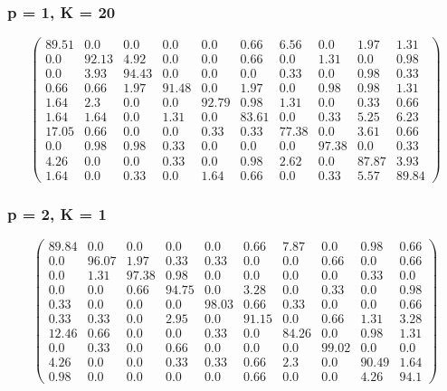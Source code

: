 \begin{appendices}
\subsubsection*{p = 1, K = 20}
$$\begin{pmatrix}
89.51&0.0&0.0&0.0&0.0&0.66&6.56&0.0&1.97&1.31\\
0.0&92.13&4.92&0.0&0.0&0.66&0.0&1.31&0.0&0.98\\
0.0&3.93&94.43&0.0&0.0&0.0&0.33&0.0&0.98&0.33\\
0.66&0.66&1.97&91.48&0.0&1.97&0.0&0.98&0.98&1.31\\
1.64&2.3&0.0&0.0&92.79&0.98&1.31&0.0&0.33&0.66\\
1.64&1.64&0.0&1.31&0.0&83.61&0.0&0.33&5.25&6.23\\
17.05&0.66&0.0&0.0&0.33&0.33&77.38&0.0&3.61&0.66\\
0.0&0.98&0.98&0.33&0.0&0.0&0.0&97.38&0.0&0.33\\
4.26&0.0&0.0&0.33&0.0&0.98&2.62&0.0&87.87&3.93\\
1.64&0.0&0.33&0.0&1.64&0.66&0.0&0.33&5.57&89.84
\end{pmatrix}$$

\subsubsection*{p = 2, K = 1}
$$\begin{pmatrix}
89.84&0.0&0.0&0.0&0.0&0.66&7.87&0.0&0.98&0.66\\
0.0&96.07&1.97&0.33&0.33&0.0&0.0&0.66&0.0&0.66\\
0.0&1.31&97.38&0.98&0.0&0.0&0.0&0.0&0.33&0.0\\
0.0&0.0&0.66&94.75&0.0&3.28&0.0&0.33&0.0&0.98\\
0.33&0.0&0.0&0.0&98.03&0.66&0.33&0.0&0.0&0.66\\
0.33&0.33&0.0&2.95&0.0&91.15&0.0&0.66&1.31&3.28\\
12.46&0.66&0.0&0.0&0.33&0.0&84.26&0.0&0.98&1.31\\
0.0&0.33&0.0&0.66&0.0&0.0&0.0&99.02&0.0&0.0\\
4.26&0.0&0.0&0.33&0.33&0.66&2.3&0.0&90.49&1.64\\
0.98&0.0&0.0&0.0&0.0&0.66&0.0&0.0&4.26&94.1
\end{pmatrix}$$


\end{appendices}
